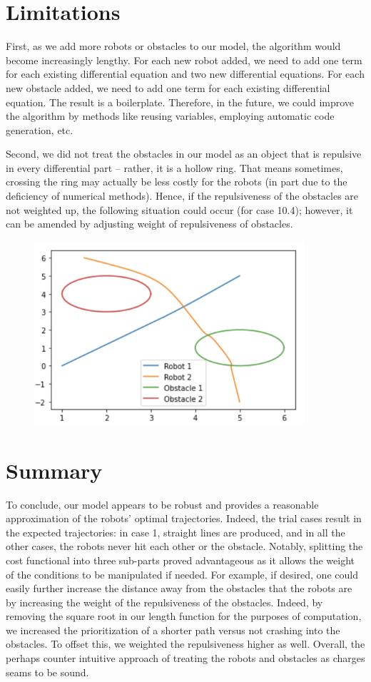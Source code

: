 \section{Limitations}
First, as we add more robots or obstacles to our model, the algorithm would become increasingly lengthy. For each new robot added, we need to add one term for each existing differential equation and two new differential equations. For each new obstacle added, we need to add one term for each existing differential equation. The result is a boilerplate. Therefore, in the future, we could improve the algorithm by methods like reusing variables, employing automatic code generation, etc.

Second, we did not treat the obstacles in our model as an object that is repulsive in every differential part -- rather, it is a hollow ring. That means sometimes, crossing the ring may actually be less costly for the robots (in part due to the deficiency of numerical methods). Hence, if the repulsiveness of the obstacles are not weighted up, the following situation could occur (for case 10.4); however, it can be amended by adjusting weight of repulsiveness of obstacles. 
\begin{figure}[H]
    \centering
    \includegraphics[width=10cm]{Graphs/limitation.png}
    \label{fig:my_label}
\end{figure}
\section{Summary}

To conclude, our model appears to be robust and provides a reasonable approximation of the robots' optimal trajectories. Indeed, the trial cases result in the expected trajectories: in case 1, straight lines are produced, and in all the other cases, the robots never hit each other or the obstacle. Notably, splitting the cost functional into three sub-parts proved advantageous as it allows the weight of the conditions to be manipulated if needed. For example, if desired, one could easily further increase the distance away from the obstacles that the robots are by increasing the weight of the repulsiveness of the obstacles. Indeed, by removing the square root in our length function for the purposes of computation, we increased the prioritization of a shorter path versus not crashing into the obstacles. To offset this, we weighted the repulsiveness higher as well. Overall, the perhaps counter intuitive approach of treating the robots and obstacles as charges seams to be sound. 


